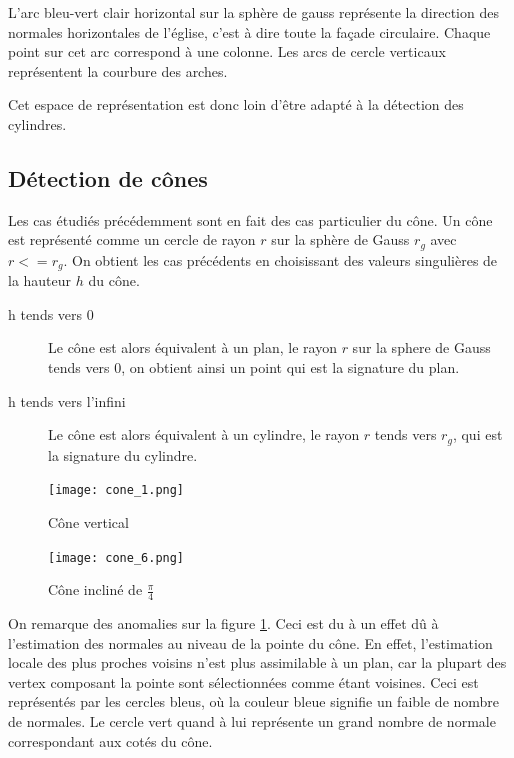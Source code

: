 \documentclass{article}
\begin{document}
L'arc bleu-vert clair horizontal sur la sphère de gauss représente la direction des normales horizontales de l'église, c'est à dire toute la façade circulaire. Chaque point sur cet arc correspond à une colonne. Les arcs de cercle verticaux représentent la courbure des arches.

Cet espace de représentation est donc loin d'être adapté à la détection des cylindres.


\subsection{Détection de cônes}

Les cas étudiés précédemment sont en fait des cas particulier du cône. Un cône est représenté comme un cercle de rayon $r$ sur la sphère de Gauss $r_g$ avec $r <= r_g$.
On obtient les cas précédents en choisissant des valeurs singulières de la hauteur $h$ du cône.

\begin{description}
\item[h tends vers 0] Le cône est alors équivalent à un plan, le rayon $r$ sur la sphere de Gauss tends vers 0, on obtient ainsi un point qui est la signature du plan.
\item[h tends vers l'infini] Le cône est alors équivalent à un cylindre, le rayon $r$ tends vers $r_g$, qui est la signature du cylindre.
\end{description}


\begin{figure}[H]
\centering
\texttt{[image: cone\_1.png]}
\caption{Cône vertical}
\end{figure}



\begin{figure}[H]
\centering
\texttt{[image: cone\_6.png]}
\caption{Cône incliné de $\frac{\pi}{4}$}
\label{fig:cone_anomalie}
\end{figure}

On remarque des anomalies sur la figure \ref{fig:cone_anomalie}. Ceci est du à un effet dû à l'estimation des normales au niveau de la pointe du cône. En effet, l'estimation locale des plus proches voisins n'est plus assimilable à un plan, car la plupart des vertex composant la pointe sont sélectionnées comme étant voisines. Ceci est représentés par les cercles bleus, où la couleur bleue signifie un faible de nombre de normales. Le cercle vert quand à lui représente un grand nombre de normale correspondant aux cotés du cône.
\end{document}
